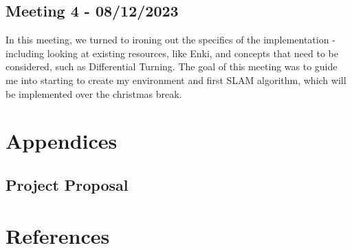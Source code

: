 \documentclass[12pt]{article}
\begin{document}
\subsection{Meeting 4 - 08/12/2023}
In this meeting, we turned to ironing out the specifics of the implementation - including looking at existing resources, like
Enki, and concepts that need to be considered, such as Differential Turning. The goal of this meeting was to guide me into
starting to create my environment and first SLAM algorithm, which will be implemented over the christmas break.

\section{Appendices}

\subsection{Project Proposal}


\section{References}
\end{document}
